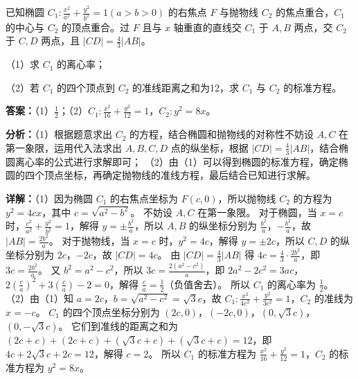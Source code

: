 \begin{question}[points=12]
已知椭圆 $C_1:\frac{x^2}{a^2}+\frac{y^2}{b^2}=1(a>b>0)$ 的右焦点 $F$ 与抛物线 $C_2$ 的焦点重合，$C_1$ 的中心与 $C_2$ 的顶点重合。过 $F$ 且与 $x$ 轴重直的直线交 $C_1$ 于 $A,B$ 两点，交 $C_2$ 于 $C,D$ 两点，且 $|CD|=\frac{4}{3}|AB|$。

（1）求 $C_1$ 的离心率；

（2）若 $C_1$ 的四个顶点到 $C_2$ 的准线距离之和为12，求 $C_1$ 与 $C_2$ 的标准方程。
\begin{solution}
\textbf{答案：}（1）$\frac{1}{2}$；（2）$C_1:\frac{x^2}{16}+\frac{y^2}{12}=1$，$C_2:y^2=8x$。

\textbf{分析：}（1）根据题意求出 $C_2$ 的方程，结合椭圆和抛物线的对称性不妨设 $A,C$ 在第一象限，运用代入法求出 $A,B,C,D$ 点的纵坐标，根据 $|CD|=\frac{4}{3}|AB|$，结合椭圆离心率的公式进行求解即可；
（2）由（1）可以得到椭圆的标准方程，确定椭圆的四个顶点坐标，再确定抛物线的准线方程，最后结合已知进行求解。

\textbf{详解：}（1）因为椭圆 $C_1$ 的右焦点坐标为 $F(c,0)$，所以抛物线 $C_2$ 的方程为 $y^2=4cx$，其中 $c=\sqrt{a^2-b^2}$。
不妨设 $A,C$ 在第一象限。
对于椭圆，当 $x=c$ 时，$\frac{c^2}{a^2}+\frac{y^2}{b^2}=1$，解得 $y=\pm\frac{b^2}{a}$，所以 $A,B$ 的纵坐标分别为 $\frac{b^2}{a}$，$-\frac{b^2}{a}$，故 $|AB|=\frac{2b^2}{a}$。
对于抛物线，当 $x=c$ 时，$y^2=4c$，解得 $y=\pm2c$，所以 $C,D$ 的纵坐标分别为 $2c$，$-2c$，故 $|CD|=4c$。
由 $|CD|=\frac{4}{3}|AB|$ 得 $4c=\frac{4}{3}\cdot\frac{2b^2}{a}$，即 $3c=\frac{2b^2}{a}$。
又 $b^2=a^2-c^2$，所以 $3c=\frac{2(a^2-c^2)}{a}$，即 $2a^2-2c^2=3ac$，$2\left(\frac{c}{a}\right)^2+3\left(\frac{c}{a}\right)-2=0$，解得 $\frac{c}{a}=\frac{1}{2}$（负值舍去）。
所以 $C_1$ 的离心率为 $\frac{1}{2}$。
（2）由（1）知 $a=2c$，$b=\sqrt{a^2-c^2}=\sqrt{3}c$，故 $C_1:\frac{x^2}{4c^2}+\frac{y^2}{3c^2}=1$，$C_2$ 的准线为 $x=-c$。
$C_1$ 的四个顶点坐标分别为 $(2c,0)$，$(-2c,0)$，$(0,\sqrt{3}c)$，$(0,-\sqrt{3}c)$。
它们到准线的距离之和为 $(2c+c)+(2c+c)+(\sqrt{3}c+c)+(\sqrt{3}c+c)=12$，即 $4c+2\sqrt{3}c+2c=12$，解得 $c=2$。
所以 $C_1$ 的标准方程为 $\frac{x^2}{16}+\frac{y^2}{12}=1$，$C_2$ 的标准方程为 $y^2=8x$。
\end{solution}
\end{question}

